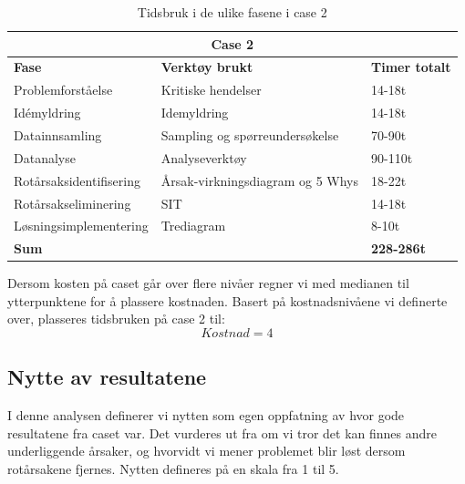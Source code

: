 \begin{table}[H]
  \centering
  \caption{Tidsbruk i de ulike fasene i case 2}
    \begin{tabular}{|lr|l|}
    \hline
    \multicolumn{3}{|c|}{\cellcolor{yellow}\textbf{Case 2}} \\
    \hline
    \multicolumn{1}{|l|}{\cellcolor{apricot}\textbf{Fase}} & \multicolumn{1}{l|}{\cellcolor{apricot}\textbf{Verktøy brukt}} & \cellcolor{apricot}\textbf{Timer totalt} \\
    \hline
    \multicolumn{1}{|l|}{Problemforståelse} & \multicolumn{1}{l|}{Kritiske hendelser} & 14-18t \\
    \hline
    \multicolumn{1}{|l|}{Idémyldring} & \multicolumn{1}{l|}{Idemyldring} & 14-18t \\
    \hline
    \multicolumn{1}{|l|}{Datainnsamling} & \multicolumn{1}{l|}{Sampling og spørreundersøkelse} & 70-90t \\
    \hline
    \multicolumn{1}{|l|}{Datanalyse} & \multicolumn{1}{l|}{Analyseverktøy} & 90-110t \\
    \hline
    \multicolumn{1}{|l|}{Rotårsaksidentifisering} & \multicolumn{1}{l|}{Årsak-virkningsdiagram og 5 Whys} & 18-22t \\
    \hline
    \multicolumn{1}{|l|}{Rotårsakseliminering} & \multicolumn{1}{l|}{SIT} & 14-18t \\
    \hline
    \multicolumn{1}{|l|}{Løsningsimplementering} & \multicolumn{1}{l|}{Trediagram} & 8-10t \\
    \hline
    \multicolumn{2}{|l|}{\textbf{Sum}} & \textbf{228-286t} \\
    \hline
    \end{tabular}%
  \label{tab:tidsbruk_case2}%
\end{table}%

Dersom kosten på caset går over flere nivåer regner vi med medianen til ytterpunktene for å plassere kostnaden. Basert på kostnadsnivåene vi definerte over, plasseres tidsbruken på case 2 til:
\[Kostnad = 4\]

\subsection{Nytte av resultatene}
I denne analysen definerer vi nytten som egen oppfatning av hvor gode resultatene fra caset var. Det vurderes ut fra om vi tror det kan finnes andre underliggende årsaker, og hvorvidt vi mener problemet blir løst dersom rotårsakene fjernes. Nytten defineres på en skala fra 1 til 5. 

